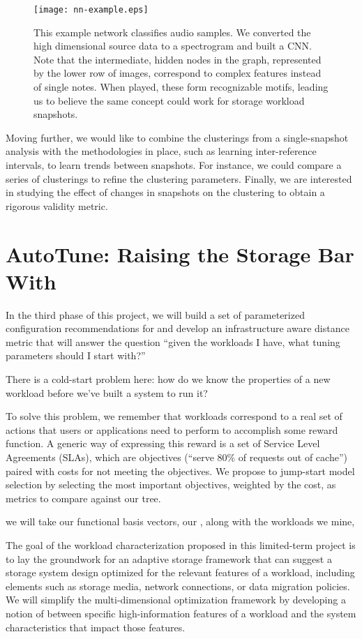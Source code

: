 \begin{figure}
    \centering
    \texttt{[image: nn-example.eps]}
    \caption{This example network classifies audio samples.  We converted the high dimensional source data to a spectrogram and built a CNN.  Note that the intermediate, hidden nodes in the graph, represented by the lower row of images, correspond to complex features instead of single notes.  When played, these form recognizable motifs, leading us to believe the same concept could work for storage workload snapshots.}
    \label{fig:nn}
\end{figure}

Moving further, we would like to combine the clusterings from a single-snapshot
analysis with the methodologies in place, such as learning inter-reference
intervals, to learn trends between snapshots.  For instance, we could compare a
series of clusterings to refine the clustering parameters.  Finally, we are
interested in studying the effect of changes in snapshots on the clustering to
obtain a rigorous validity metric.
\section{AutoTune: Raising the Storage Bar With \Mws}%


In the third phase of this project, we will build a set of parameterized configuration
recommendations for \mws and develop an infrastructure aware distance metric
that will answer the question ``given the workloads I have, what tuning
parameters should I start with?''

There is a cold-start problem here: how do we know the properties of a new
workload before we've built a system to run it?  

To solve this problem, we remember that workloads correspond to a real set of
actions that users or applications need to perform to accomplish some reward
function.  A generic way of expressing this reward is a set of Service Level
Agreements (SLAs), which are objectives (\eg ``serve 80\% of requests out of
cache'') paired with costs for not meeting the objectives.  We propose to
jump-start model selection by selecting the most important objectives, weighted
by the cost, as metrics to compare against our \mws tree.



we will take our functional basis vectors,
our \mWs, along with the workloads we mine, 


The goal of the workload characterization proposed in this limited-term project is to lay
the groundwork for an adaptive storage framework that can suggest a 
storage system design optimized for the relevant features of a workload, including elements such as storage media, network
connections, or data migration policies.  We will simplify the multi-dimensional
optimization framework by developing a notion of \systemfit between specific
high-information features of a workload and the system characteristics that
impact those features.  %


